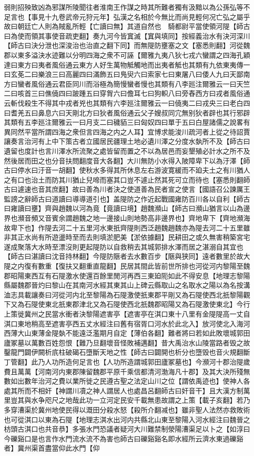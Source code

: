 弱則招殃致凶為邪謀所陵聞往者淮南王作謀之時其所難者獨有汲黯以為公孫弘等不足言也【事見十九卷武帝元狩元年】弘漢之名相於今無比而尚見輕何况亡弘之屬乎故曰朝廷亡人則為賊亂所輕【亡讀曰無】其道自然也　騎都尉平當使領河隄【師古曰為使而領其事使音疏吏翻】奏九河今皆窴滅【窴與填同】按經義治水有決河深川【師古曰決分泄也深浚治也治直之翻下同】而無隄防壅塞之文【塞悉則翻】河從魏郡以東多溢決水迹難以分明四海之衆不可誣【爾雅九夷八狄七戎六蠻謂之四海孔穎達曰東方曰夷者風俗通云東方人好生萬物觝觸地而出夷者觝也其類有九依東夷傳一曰玄莬二曰樂浪三曰高麗四曰滿飾五曰鳬臾六曰索家七曰東屠八曰倭人九曰天鄙南方曰蠻者風俗通云君臣同川而浴極為簡慢蠻者慢也其類有八李廵注爾雅云一曰天竺二曰咳首三曰僬僥四曰跛踵五曰穿胷六曰儋耳七曰狗軹八曰旁舂西方曰戎者風俗通云斬伐殺生不得其中戎者兇也其類有六李廵注爾雅云一曰僥夷二曰戎央三曰老白四曰耆羌五曰鼻息六曰天剛北方曰狄者風俗通云父子嫂叔同宂無别狄者辟也其行邪辟其類有五李廵注爾雅云一曰月支二曰穢貊三曰匈奴四曰單于五曰白屋諸儒之說畧有異同然平當所謂四海之衆但言四海之内之人耳】宜博求能浚川疏河者上從之待詔賈讓奏言治河有上中下策古者立國居民疆理土地必遺川澤之分度水埶所不及【師古曰遺留也度計也言川澤水所流聚之處皆留而置之不以為居邑而妄墾殖必計水之所不及然後居而田之也分音扶問翻度音大各翻】大川無防小水得入陂障卑下以為汙澤【師古曰停水曰汙音一胡翻】使秋水多得其所休息左右游波寛緩而不廹夫土之有川猶人之有口也治土而防其川猶止兒啼而塞其口豈不遽止然其死可立而待也【塞悉則翻師古曰遽速也音其庶翻】故曰善為川者決之使道善為民者宣之使言【國語召公諫厲王監謗之辭師古曰道讀曰導導道引也】盖隄防之作近起戰國雍防百川各以自利【師古曰雍讀曰壅】齊與趙魏以河為竟【竟讀曰境】趙魏瀕山【師古曰瀕山猶言以山為邊界也瀕音頻又音賓余謂趙魏之地一邊接山則地勢高非邊界也】齊地卑下【齊地瀕海故卑下也】作隄去河二十五里河水東扺齊隄則西泛趙魏趙魏亦為隄去河二十五里雖非其正水尚有所遊盪時至而去則填淤肥美【淤依據翻】民耕田之或久無害稍築宮宅遂成聚落大水時至漂沒則更起隄防以自救稍去其城郭排水澤而居之湛溺自其宜也【師古曰湛讀曰沈音持林翻】今隄防陿者去水數百步【陿與狭同】遠者數里於故大隄之内復有數重【復扶又翻重直龍翻】民居其間此皆前世所排也河從河内黎陽至魏郡昭陽東西互有石隄激水使還百餘里閒河再西三東廹阨如此不得安息【地理志黎陽縣屬魏郡晉灼曰黎山在其南河水經其東其山上碑云縣取山之名取水之陽以為名按溝洫志具載讓奏曰河從河内北至黎陽為石隄激使扺東郡平剛又為石隄使西北扺黎陽觀下又為石隄使東北扺東郡津北又為石隄使西北扺魏郡昭陽又為石隄激使東北】今行上策徙冀州之民當水衝者決黎陽遮害亭【遮害亭在淇口東十八里有金隄隄高一丈自淇口東地稍高至遮害亭西五丈水經注曰舊有宿胥口河水於此北入】放河使北入海河西薄大山東薄金隄埶不能遠泛濫期月自定【薄伯各翻】難者將曰若如此敗壞城郭田廬冢墓以萬數百姓怨恨【難乃旦翻壞音怪敗補邁翻】昔大禹治水山陵當路者毁之故鑿龍門闢伊闕析㡳柱破碣石墮斷天地之性【師古曰闢開也析分也墮毁也音火規翻斷丁管翻】此乃人功所造何足言也【人功所造謂城郭田廬冢墓也】今瀕河十郡治隄歲費且萬萬【河南河内東郡陳留魏郡平原千乘信都清河渤海凡十郡】及其大決所殘無數如出數年治河之費以業所徙之民遵古聖之法定山川之位【謂依禹迹也】使神人各處其所而不相奸【神謂川凟之神人謂居人也處昌呂翻師古曰奸音干】且大漢方制萬里豈其與水争咫尺之地哉此功一立河定民安千載無患故謂之上策【載子亥翻】若乃多穿漕渠於冀州地使民得以溉田分殺水怒【殺所介翻减也】雖非聖人法然亦救敗術也可從淇口以東為石隄【地理志淇水出河内共縣北山東至黎陽入河水經注曰魏晉之枋頭古淇口也共音恭】多張水門恐議者疑河大川難禁制滎陽漕渠足以卜之【如淳曰今礫谿口是也言作水門流水流不為害也師古曰礫谿谿名即水經所云濟水東過礫谿者】冀州渠首盡當仰此水門【仰